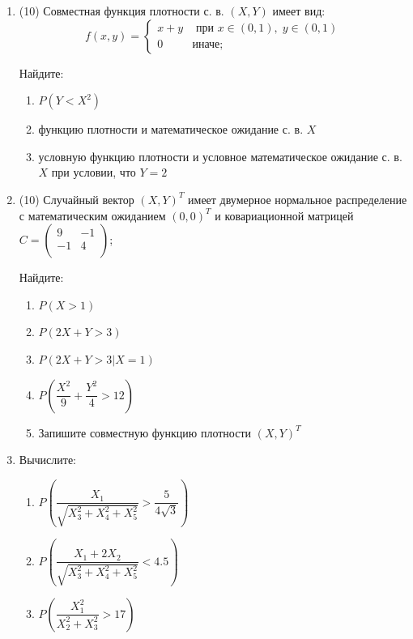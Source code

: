 \documentclass[12pt, a4paper]{article}\usepackage[]{graphicx}\usepackage[]{color}
\begin{document}
				\begin{enumerate}
					\item (10) Совместная функция плотности с. в. $(X,Y)$ имеет вид:
					\begin{equation*}
					f(x,y) =
					\begin{cases}
					x+y &\text{ при }x \in (0,1),\;y \in (0,1) \\
					0 &\text{иначе};
					\end{cases}
					\end{equation*}

					Найдите:
					\begin{enumerate}
						\item $P(Y<X^2)$
						\item функцию плотности и математическое ожидание с. в. $X$
						\item условную функцию плотности и условное математическое ожидание с. в. $X$ при условии, что $Y=2$
					\end{enumerate}

					\item (10) Случайный вектор $(X,Y)^T$ имеет двумерное нормальное распределение с математическим ожиданием $(0,0)^T$ и ковариационной матрицей \\
					$C = \begin{pmatrix}
					9 & -1 \\
					-1 & 4 \\
					\end{pmatrix}$;

					Найдите:
					\begin{enumerate}
						\item $P(X>1)$
						\item $P(2X+Y>3)$
						\item $P(2X+Y>3|X=1)$
						\item $P\left(\dfrac{X^2}{9}+\dfrac{Y^2}{4} >12\right)$
						\item Запишите совместную функцию плотности  $(X,Y)^T$
					\end{enumerate}

					\item Вычислите:
					\begin{enumerate}
						\item $P\left(\dfrac{X_1}{\sqrt{X_3^2+X_4^2+X_5^2}}>\dfrac{5}{4\sqrt{3}}\right)$
						\item $P\left(\dfrac{X_1+2X_2}{\sqrt{X_3^2+X_4^2+X_5^2}}<4.5\right)$
						\item $P\left(\dfrac{X_1^2}{X_2^2+X_3^2}>17\right)$
					\end{enumerate}


\end{enumerate}
\end{document}
